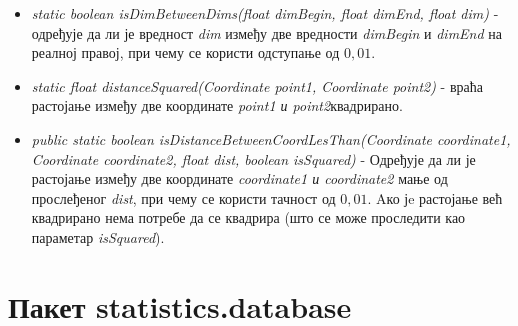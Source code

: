 \begin{itemize}
\item \emph{static boolean isDimBetweenDims(float dimBegin, float dimEnd, float dim)} -  одређује да ли је вредност \emph{dim} између две вредности \emph{dimBegin} и \emph{dimEnd} на реалној правој, при чему се користи одступање од $0,01$.
\item \emph{static float distanceSquared(Coordinate point1, Coordinate point2)} - враћа растојање између две координате \emph{point1 \emph{и} point2}квадрирано.
\item \emph{ public static boolean isDistanceBetweenCoordLesThan(Coordinate coordinate1, Coordinate coordinate2, float dist, boolean isSquared)} -  Одређује да ли је растојање између две координате \emph{coordinate1 \emph{и} coordinate2} мање од прослеђеног \emph{dist}, при чему се користи тачност од $0,01$. Aко јe растојање већ квадрирано нема потребе да се квадрира (што се може проследити као параметар \emph{isSquared}).
\end{itemize}

\section{Пакет statistics.database}


